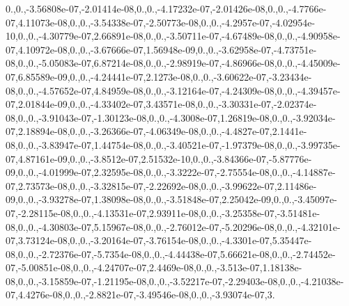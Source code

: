 {0.,0.,-\/3.\-56808e-\/07,-\/2.\-01414e-\/08,0.,0.,-\/4.\-17232e-\/07,-\/2.\-01426e-\/08,0.,0.,-\/4.\-7766e-\/07,4.\-11073e-\/08,0.,0.,-\/3.\-54338e-\/07,-\/2.\-50773e-\/08,0.,0.,-\/4.\-2957e-\/07,-\/4.\-02954e-\/10,0.,0.,-\/4.\-30779e-\/07,2.\-66891e-\/08,0.,0.,-\/3.\-50711e-\/07,-\/4.\-67489e-\/08,0.,0.,-\/4.\-90958e-\/07,4.\-10972e-\/08,0.,0.,-\/3.\-67666e-\/07,1.\-56948e-\/09,0.,0.,-\/3.\-62958e-\/07,-\/4.\-73751e-\/08,0.,0.,-\/5.\-05083e-\/07,6.\-87214e-\/08,0.,0.,-\/2.\-98919e-\/07,-\/4.\-86966e-\/08,0.,0.,-\/4.\-45009e-\/07,6.\-85589e-\/09,0.,0.,-\/4.\-24441e-\/07,2.\-1273e-\/08,0.,0.,-\/3.\-60622e-\/07,-\/3.\-23434e-\/08,0.,0.,-\/4.\-57652e-\/07,4.\-84959e-\/08,0.,0.,-\/3.\-12164e-\/07,-\/4.\-24309e-\/08,0.,0.,-\/4.\-39457e-\/07,2.\-01844e-\/09,0.,0.,-\/4.\-33402e-\/07,3.\-43571e-\/08,0.,0.,-\/3.\-30331e-\/07,-\/2.\-02374e-\/08,0.,0.,-\/3.\-91043e-\/07,-\/1.\-30123e-\/08,0.,0.,-\/4.\-3008e-\/07,1.\-26819e-\/08,0.,0.,-\/3.\-92034e-\/07,2.\-18894e-\/08,0.,0.,-\/3.\-26366e-\/07,-\/4.\-06349e-\/08,0.,0.,-\/4.\-4827e-\/07,2.\-1441e-\/08,0.,0.,-\/3.\-83947e-\/07,1.\-44754e-\/08,0.,0.,-\/3.\-40521e-\/07,-\/1.\-97379e-\/08,0.,0.,-\/3.\-99735e-\/07,4.\-87161e-\/09,0.,0.,-\/3.\-8512e-\/07,2.\-51532e-\/10,0.,0.,-\/3.\-84366e-\/07,-\/5.\-87776e-\/09,0.,0.,-\/4.\-01999e-\/07,2.\-32595e-\/08,0.,0.,-\/3.\-3222e-\/07,-\/2.\-75554e-\/08,0.,0.,-\/4.\-14887e-\/07,2.\-73573e-\/08,0.,0.,-\/3.\-32815e-\/07,-\/2.\-22692e-\/08,0.,0.,-\/3.\-99622e-\/07,2.\-11486e-\/09,0.,0.,-\/3.\-93278e-\/07,1.\-38098e-\/08,0.,0.,-\/3.\-51848e-\/07,2.\-25042e-\/09,0.,0.,-\/3.\-45097e-\/07,-\/2.\-28115e-\/08,0.,0.,-\/4.\-13531e-\/07,2.\-93911e-\/08,0.,0.,-\/3.\-25358e-\/07,-\/3.\-51481e-\/08,0.,0.,-\/4.\-30803e-\/07,5.\-15967e-\/08,0.,0.,-\/2.\-76012e-\/07,-\/5.\-20296e-\/08,0.,0.,-\/4.\-32101e-\/07,3.\-73124e-\/08,0.,0.,-\/3.\-20164e-\/07,-\/3.\-76154e-\/08,0.,0.,-\/4.\-3301e-\/07,5.\-35447e-\/08,0.,0.,-\/2.\-72376e-\/07,-\/5.\-7354e-\/08,0.,0.,-\/4.\-44438e-\/07,5.\-66621e-\/08,0.,0.,-\/2.\-74452e-\/07,-\/5.\-00851e-\/08,0.,0.,-\/4.\-24707e-\/07,2.\-4469e-\/08,0.,0.,-\/3.\-513e-\/07,1.\-18138e-\/08,0.,0.,-\/3.\-15859e-\/07,-\/1.\-21195e-\/08,0.,0.,-\/3.\-52217e-\/07,-\/2.\-29403e-\/08,0.,0.,-\/4.\-21038e-\/07,4.\-4276e-\/08,0.,0.,-\/2.\-8821e-\/07,-\/3.\-49546e-\/08,0.,0.,-\/3.\-93074e-\/07,3.}
